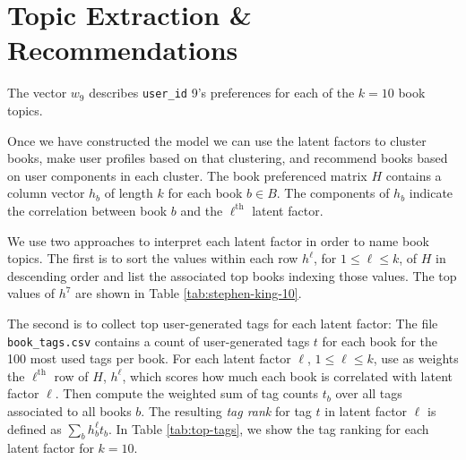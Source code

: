 \documentclass[11pt]{article}
\begin{document}






\newpage

    \hypertarget{topic-extraction}{%
\section{Topic Extraction \& Recommendations}\label{topic-extraction}}


\begin{table}
\vspace{-10pt}
\centering
  
  \caption[User Profile]{The vector $w_9$ describes \texttt{user\_id} 9's preferences for each of the $k=10$ book topics.}
  \label{tab:user-profile-9}
  \vspace{-0pt}
\end{table}



Once we have constructed the model we can use the latent factors to cluster books, make user profiles based on that clustering,
and recommend books based on user components in each cluster.
The book preferenced matrix $H$ contains a column vector $h_b$ of length $k$ for each book $b \in B$.
The components of $h_b$ indicate the correlation between book $b$ and the $\ell^{\text{th}}$ latent factor.

We use two approaches to interpret each latent factor in order to name book topics.
The first is to sort the values within each row $h^\ell$, for $1 \leq \ell \leq k$, of $H$ in descending order and list the associated top books indexing those values.
The top values of $h^7$ are shown in Table \ref{tab:stephen-king-10}.

The second is to collect top user-generated tags for each latent factor:
The file \texttt{book\_tags.csv} contains a count of user-generated tags $t$ for each book for the 100 most used tags per book.
For each latent factor $\ell$, $1 \leq \ell \leq k$, use as weights the $\ell^{\text{th}}$ row of $H$, $h^\ell$,
which scores how much each book is correlated with latent factor $\ell$.
Then compute the weighted sum of tag counts $t_b$ over all tags associated to all books $b$.
The resulting \emph{tag rank} for tag $t$ in latent factor $\ell$ is defined as $\sum_b h^\ell_b t_b$.
In Table \ref{tab:top-tags}, we show the tag ranking for each latent factor for $k=10$.
\end{document}
